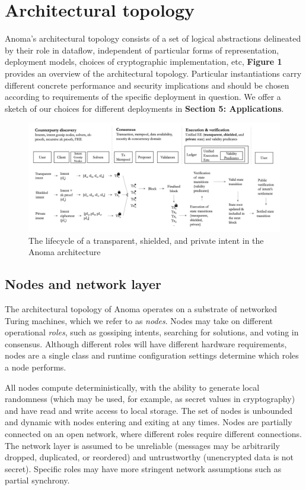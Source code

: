 \documentclass[
    9pt,            %
    commun,        %
    affiltop,       %
]{art}
\begin{document}
\section{Architectural topology}\label{architectural-topology}

Anoma's architectural topology consists of a set of
logical abstractions delineated by their role in dataflow, independent
of particular forms of representation, deployment models, choices of
cryptographic implementation, etc, \textbf{Figure 1} provides an
overview of the architectural topology. Particular instantiations carry
different concrete performance and security implications and should be
chosen according to requirements of the specific deployment in question.
We offer a sketch of our choices for different deployments in
\textbf{Section 5: Applications}.

\begin{figure}
  \includegraphics[width=\textwidth,keepaspectratio]{figs/intents-lifecycle.jpeg}
  \caption{The lifecycle of a transparent, shielded, and private intent in the Anoma architecture}
\end{figure}
  

\subsection{Nodes and network layer}\label{nodes-and-network-layer}

The architectural topology of Anoma operates on a substrate of networked
Turing machines, which we refer to as \emph{nodes}. Nodes may take on
different operational \emph{roles}, such as gossiping intents, searching
for solutions, and voting in consensus. Although different roles will
have different hardware requirements, nodes are a single class and
runtime configuration settings determine which roles a node performs.

All nodes compute deterministically, with the ability to generate local
randomness (which may be used, for example, as secret values in
cryptography) and have read and write access to local storage. The set
of nodes is unbounded and dynamic with nodes entering and exiting at any
times. Nodes are partially connected on an open network, where different
roles require different connections. The network layer is assumed to be
unreliable (messages may be arbitrarily dropped, duplicated, or
reordered) and untrustworthy (unencrypted data is not secret). Specific
roles may have more stringent network assumptions such as partial
synchrony.
\end{document}
